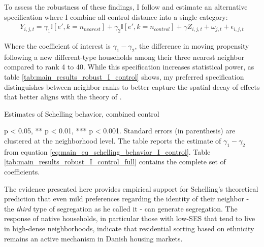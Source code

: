 \documentclass[../main.tex]{subfiles}
\begin{document}
To assess the robustness of these findings, I follow \textcite{Bayer_2022_nearest_neighbor} and estimate an alternative specification where I combine all control distance into a single category:
\begin{equation}
\begin{split}
    Y_{i, j, t} = \gamma_1 \mathbb{I}[e', k=n_{nearest}] + \gamma_2 \mathbb{I}[e', k = n_{control}] + \gamma Z_{i, j, t} + \omega_{j, t} + \epsilon_{i, j, t}
\label{eq:main_eq_schelling_behavior_I_control}
\end{split}
\end{equation}

Where the coefficient of interest is $\gamma_1-\gamma_2$, the difference in moving propensity following a new different-type households among their three nearest neighbor compared to rank 4 to 40. While this specification increases statistical power, as table \ref{tab:main_results_robust_I_control} shows, my preferred specification distinguishes between neighbor ranks to better capture the spatial decay of effects that better aligns with the theory of \textcite{schelling1971dynamic}.


\begin{table}[H]
    \centering
    \caption{Estimates of Schelling behavior, combined control}
    \label{tab:main_results_robust_I_control}
    \begin{threeparttable}
            
    \begin{tablenotes}[flushleft]
    \item \scriptsize * p < 0.05, ** p < 0.01, *** p < 0.001. Standard errors (in parenthesis) are clustered at the neighborhood level. The table reports the estimate of $\gamma_1 - \gamma_2$ from equation \ref{eq:main_eq_schelling_behavior_I_control}. Table \ref{tab:main_results_robust_I_control_full} contains the complete set of coefficients. 
    \end{tablenotes}
    \end{threeparttable}
\end{table}

The evidence presented here provides empirical support for Schelling's theoretical prediction that even mild preferences regarding the identity of their neighbor - the \textit{third} type of segregation as he called it - can generate segregation. The response of native households, in particular those with low-SES that tend to live in high-dense neighborhoods, indicate that residential sorting based on ethnicity remains an active mechanism in Danish housing markets. 
\end{document}
